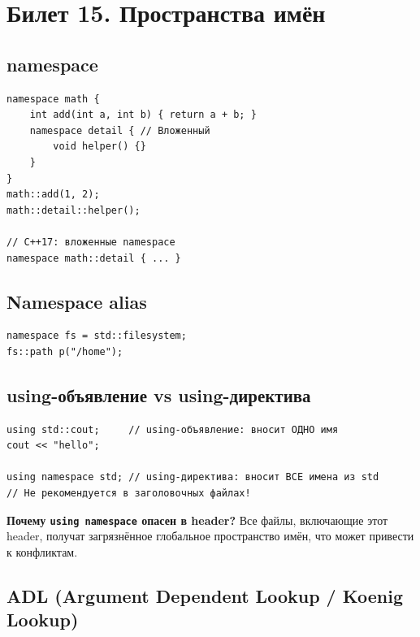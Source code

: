 \documentclass[12pt,a4paper]{article}
\begin{document}
\section{Билет 15. Пространства имён}

\subsection{namespace}

\begin{lstlisting}
namespace math {
    int add(int a, int b) { return a + b; }
    namespace detail { // Вложенный
        void helper() {}
    }
}
math::add(1, 2);
math::detail::helper();

// C++17: вложенные namespace
namespace math::detail { ... }
\end{lstlisting}

\subsection{Namespace alias}

\begin{lstlisting}
namespace fs = std::filesystem;
fs::path p("/home");
\end{lstlisting}

\subsection{using-объявление vs using-директива}

\begin{lstlisting}
using std::cout;     // using-объявление: вносит ОДНО имя
cout << "hello";

using namespace std; // using-директива: вносит ВСЕ имена из std
// Не рекомендуется в заголовочных файлах!
\end{lstlisting}

\textbf{Почему \texttt{using namespace} опасен в header?} Все файлы, включающие этот header, получат загрязнённое глобальное пространство имён, что может привести к конфликтам.

\subsection{ADL (Argument Dependent Lookup / Koenig Lookup)}
\end{document}
